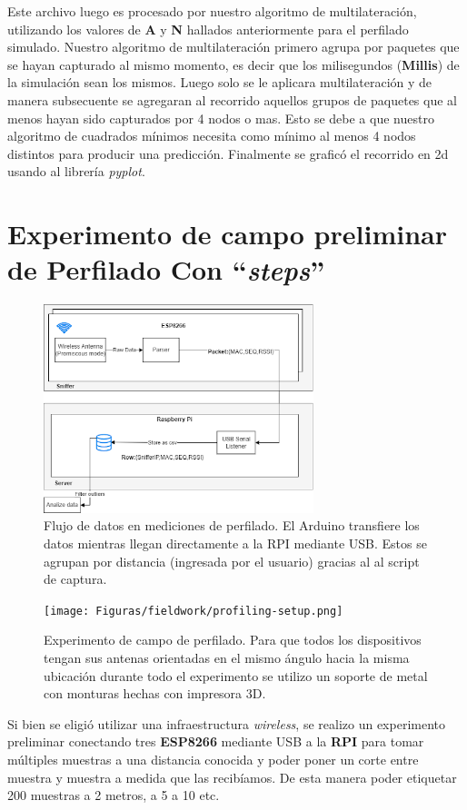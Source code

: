 Este archivo luego es procesado por nuestro algoritmo de multilateración, utilizando los valores de \textbf{A} y \textbf{N} hallados anteriormente para el perfilado simulado. Nuestro algoritmo de multilateración primero agrupa por paquetes que se hayan capturado al mismo momento, es decir que los milisegundos (\textbf{Millis}) de la simulación sean los mismos. Luego solo se le aplicara multilateración y de manera subsecuente se agregaran al recorrido aquellos grupos de paquetes que al menos hayan sido capturados por 4 nodos o mas. Esto se debe a que nuestro algoritmo de cuadrados mínimos necesita como mínimo al menos 4 nodos distintos para producir una predicción. Finalmente se graficó el recorrido en 2d usando al librería \textit{pyplot}.

\section{Experimento de campo preliminar de Perfilado Con \textbf{“\textit{steps}”} }
\begin{figure}[!htb]
	\centering
	\includegraphics[width=0.7\textwidth]{Figuras/infraestructure/arduino-rpi.png}
	\captionsetup{margin=2cm}
	\caption[Flujo de datos en mediciones de perfilado]{Flujo de datos en mediciones de perfilado. El Arduino transfiere los datos mientras llegan directamente a la RPI mediante USB. Estos se agrupan por distancia (ingresada por el usuario) gracias al al script de captura.}
	\label{fig:infra-diagram-arduino}
\end{figure}
\begin{figure}[!htb]
	\centering
	\texttt{[image: Figuras/fieldwork/profiling-setup.png]}
	\captionsetup{margin=2cm}
	\caption[Perfilado]{Experimento de campo de perfilado. Para que todos los dispositivos tengan sus antenas orientadas en el
mismo ángulo hacia la misma ubicación durante todo el experimento se utilizo
un soporte de metal con monturas hechas con impresora 3D.}
	\label{fig:arduino-profiling-setup}
\end{figure}
Si bien se eligió utilizar una infraestructura \textit{wireless}, se realizo un experimento preliminar conectando tres \textbf{ESP8266} mediante USB a la \textbf{RPI} para tomar múltiples muestras a una distancia conocida y poder poner un corte entre muestra y muestra a medida que las recibíamos. De esta manera poder etiquetar 200 muestras a 2 metros, a 5 a 10 etc.

